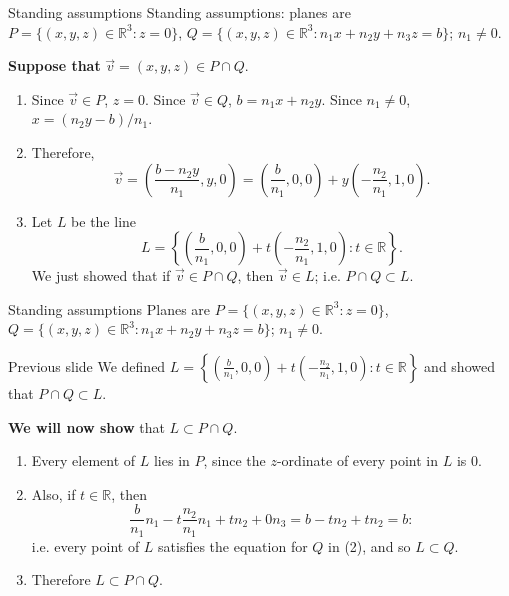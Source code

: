\documentclass{beamer}
\newcommand{\R}{\mathbb{R}}
\begin{document}
\begin{frame}

\begin{block}{Standing assumptions}
Standing assumptions: planes are $ P = \{ (x,y,z) \in \R^3 : z = 0 \} $, $Q = \{ (x,y,z) \in \R^3 : n_1 x + n_2 y + n_3 z = b \} $; $ n_1 \neq 0 $.
\end{block}

\textbf{Suppose that} $ \vec{v} = (x,y,z) \in P \cap Q $.
\begin{enumerate}
  \item Since $ \vec{v} \in P $, $ z = 0 $. Since $ \vec{v} \in Q $, $ b = n_1 x + n_2 y $.
        Since $ n_1 \neq 0 $, $ x = (n_2 y - b)/n_1 $.
  \item Therefore,
  \begin{displaymath}
    \vec{v} = \left( \frac{b - n_2 y }{n_1}, y, 0 \right) = \left( \frac{b}{n_1}, 0, 0 \right) + y \left( -\frac{n_2}{n_1}, 1, 0 \right).
  \end{displaymath}
  \item Let $ L $ be the line
  \begin{displaymath}
    L = \left\{ \left( \frac{b}{n_1}, 0, 0 \right) + t \left( -\frac{n_2}{n_1}, 1, 0 \right) : t \in \R \right\}.
  \end{displaymath}
  We just showed that if $ \vec{v} \in P \cap Q $, then $ \vec{v} \in L $; i.e. $ P \cap Q \subset L $.
\end{enumerate}
\end{frame}

\begin{frame}
\begin{block}{Standing assumptions}
Planes are $ P = \{ (x,y,z) \in \R^3 : z = 0 \} $, $Q = \{ (x,y,z) \in \R^3 : n_1 x + n_2 y + n_3 z = b \} $; $ n_1 \neq 0 $.
\end{block}

\begin{block}{Previous slide}
We defined  $   L = \left\{ \left( \frac{b}{n_1}, 0, 0 \right) + t \left( -\frac{n_2}{n_1}, 1, 0 \right) : t \in \R \right\} $
and showed that $ P \cap Q \subset L $.
\end{block}

\textbf{We will now show} that $ L \subset P \cap Q $.
\begin{enumerate}
  \item Every element of $ L $ lies in $ P $, since the $ z$-ordinate of every point in $ L $ is $0$.
  \item Also, if $ t \in \R $, then
  \begin{displaymath}
    \frac{b}{n_1} n_1 - t\frac{n_2}{n_1} n_1 + t n_2 + 0 n_3 = b -t n_2 + t n_2 = b:
  \end{displaymath}
  i.e. every point of $ L $ satisfies the equation for $ Q $ in (2), and so $ L \subset Q $.
  \item Therefore $ L \subset P \cap Q $.
\end{enumerate}
\end{frame}
\end{document}
